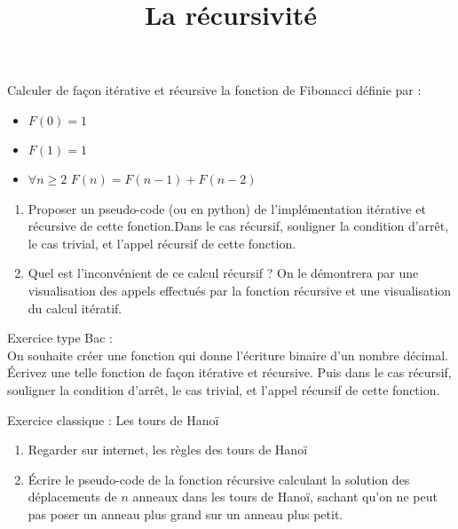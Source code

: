 \documentclass[12pt,fleqn]{article} %
\date{}
\begin{document}
\title{La récursivité}
\maketitle

\begin{exercise}
	Calculer de façon itérative et récursive la fonction de Fibonacci définie par : \begin{itemize}
		\item $F(0)=1$
		\item $F(1)= 1$
		\item $\forall n \geq 2$ $F(n) = F(n-1) + F(n - 2)$
	\end{itemize}

\begin{enumerate}
	\item Proposer un pseudo-code (ou en python) de l'implémentation itérative et récursive de cette fonction.Dans le cas récursif, souligner la condition d'arrêt, le cas trivial, et l'appel récursif de cette fonction.

	\item Quel est l'inconvénient de ce calcul récursif ? On le démontrera par une visualisation des appels effectués par la fonction récursive et une visualisation du calcul itératif.
\end{enumerate}
\end{exercise}




\begin{exercise}
	Exercice type Bac : \\
	On souhaite créer une fonction qui donne l'écriture binaire d'un nombre décimal. Écrivez une telle fonction de façon itérative et récursive. Puis dans le cas récursif, souligner la condition d'arrêt, le cas trivial, et l'appel récursif de cette fonction.
	
\end{exercise}

\begin{exercise}
	Exercice classique : Les tours de Hanoï \\
\begin{enumerate}
	\item Regarder sur internet, les règles des tours de Hanoï
	\item \'Ecrire le pseudo-code de la fonction récursive calculant la solution des déplacements de $n$ anneaux dans les tours de Hanoï, sachant qu'on ne peut pas poser un anneau plus grand sur un anneau plus petit.
\end{enumerate}
\end{exercise}
\end{document}
